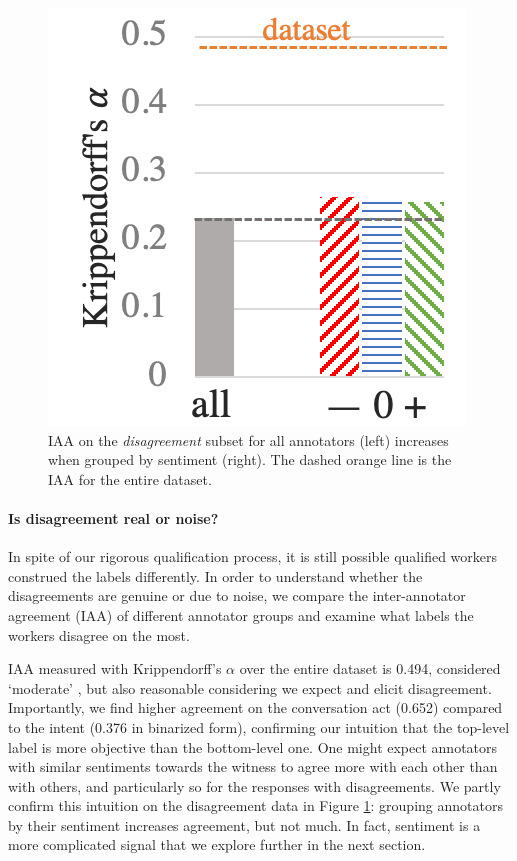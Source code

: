 \begin{figure}
\vspace{-1.2em}
\centering
\includegraphics[scale=0.4]{plots/subj_kripp_bar.pdf}
\vspace{-.3em}
  \caption{IAA on the \textit{disagreement} subset for all annotators (left) increases when grouped by sentiment (right). The dashed orange line is the IAA for the entire dataset.}
  \label{fig:subj_kripp}
\end{figure}

\paragraph{Is disagreement real or noise?} In spite of our rigorous qualification process, it is still possible qualified workers construed the labels differently. In order to understand whether the disagreements are genuine or due to noise, we compare the inter-annotator agreement (IAA) of different annotator groups and examine what labels the workers disagree on the most. 

IAA measured with Krippendorff's $\alpha$ over the entire dataset is 0.494, considered `moderate' \cite{Artstein:2008}, but also reasonable considering we expect and elicit disagreement. Importantly, we find higher agreement on the conversation act (0.652) compared to the intent (0.376 in binarized form), confirming our intuition that the top-level label is more objective than the bottom-level one. One might expect annotators with similar sentiments towards the witness to agree more with each other than with others, and particularly so for the responses with disagreements. We partly confirm this intuition on the disagreement data in Figure \ref{fig:subj_kripp}: grouping annotators by their sentiment increases agreement, but not much. In fact, sentiment is a more complicated signal that we explore further in the next section.  

